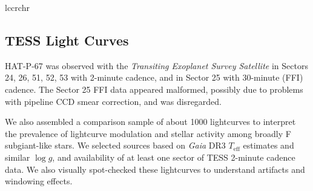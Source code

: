 \documentclass[twocolumn]{aastex631}
\begin{document}
\begin{deluxetable}{lccrchr}
    \tablewidth{0pc}
    \tabletypesize{\scriptsize}
    \startdata
    
    \enddata
\end{deluxetable}

\subsection{TESS Light Curves}
HAT-P-67 was observed with the \emph{Transiting Exoplanet Survey Satellite} \citep[TESS,][]{2014SPIE.9143E..20R} in Sectors 24, 26, 51, 52, 53 with 2-minute cadence, and in Sector 25 with 30-minute (FFI) cadence.  The Sector 25 FFI data appeared malformed, possibly due to problems with pipeline CCD smear correction, and was disregarded.

We also assembled a comparison sample of about 1000 lightcurves to interpret the prevalence of lightcurve modulation and stellar activity among broadly F subgiant-like stars.  We selected sources based on \emph{Gaia} DR3 $T_\mathrm{eff}$ estimates and similar $\log{g}$,  and availability of at least one sector of TESS 2-minute cadence data.  We also visually spot-checked these lightcurves to understand artifacts and windowing effects.
\end{document}

